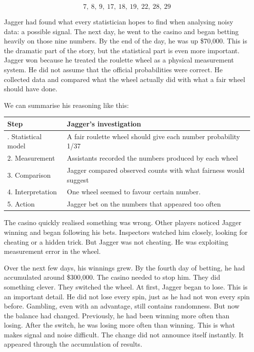 \documentclass[
  letterpaper,
  DIV=11,
  numbers=noendperiod]{scrreprt}
\begin{document}
\begin{tcolorbox}
\[
7,\ 8,\ 9,\ 17,\ 18,\ 19,\ 22,\ 28,\ 29
\]

Jagger had found what every statistician hopes to find when analysing
noisy data: a possible signal. The next day, he went to the casino and
began betting heavily on those nine numbers. By the end of the day, he
was up \$70,000. This is the dramatic part of the story, but the
statistical part is even more important. Jagger won because he treated
the roulette wheel as a physical measurement system. He did not assume
that the official probabilities were correct. He collected data and
compared what the wheel actually did with what a fair wheel should have
done.

We can summarise his reasoning like this:

\begin{table}
\fontsize{12.0pt}{14.0pt}\selectfont
\begin{tabular*}{\linewidth}{@{\extracolsep{\fill}}ll}
\toprule
Step & Jagger's investigation \\ 
\midrule\addlinespace[2.5pt]
1. Statistical model & A fair roulette wheel should give each number probability 1/37 \\ 
2. Measurement & Assistants recorded the numbers produced by each wheel \\ 
3. Comparison & Jagger compared observed counts with what fairness would suggest \\ 
4. Interpretation & One wheel seemed to favour certain number. \\ 
5. Action & Jagger bet on the numbers that appeared too often \\ 
\bottomrule
\end{tabular*}
\end{table}

The casino quickly realised something was wrong. Other players noticed
Jagger winning and began following his bets. Inspectors watched him
closely, looking for cheating or a hidden trick. But Jagger was not
cheating. He was exploiting measurement error in the wheel.

Over the next few days, his winnings grew. By the fourth day of betting,
he had accumulated around \$300,000. The casino needed to stop him. They
did something clever. They switched the wheel. At first, Jagger began to
lose. This is an important detail. He did not lose every spin, just as
he had not won every spin before. Gambling, even with an advantage,
still contains randomness. But now the balance had changed. Previously,
he had been winning more often than losing. After the switch, he was
losing more often than winning. This is what makes signal and noise
difficult. The change did not announce itself instantly. It appeared
through the accumulation of results.


\end{tcolorbox}
\end{document}
